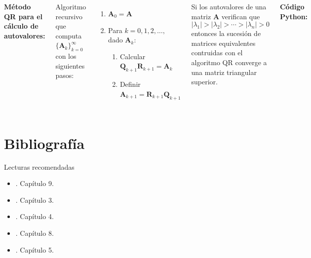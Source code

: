 \documentclass[9pt, aspectratio=169]{beamer}
\begin{document}
\begin{frame}
	\begin{columns}[t]
		\textbf{Método QR para el cálculo de autovalores:} %

		Algoritmo recursivo que computa $\{ \bm{A}_k \}_{k = 0}^{\infty}$ con los siguientes pasos:
		\begin{enumerate}
			\item $\bm{A}_0 = \bm{A}$
			\item Para $k = 0, 1, 2, \ldots,$ dado $\bm{A}_k$:
			      \begin{enumerate}
				      \item Calcular $\bm{Q}_{k+1} \bm{R}_{k+1} = \bm{A}_k $
				      \item Definir $\bm{A}_{k+1} = \bm{R}_{k+1} \bm{Q}_{k+1}$
			      \end{enumerate}
		\end{enumerate} \pause

		\begin{theorem}[Convergencia]
			Si los autovalores de una matriz $\bm{A}$ verifican que
			\[ |\lambda_1| > |\lambda_2| > \cdots > |\lambda_n| > 0 \]
			entonces la sucesión de matrices equivalentes contruidas con el algoritmo QR converge a una matriz triangular superior.
		\end{theorem}

		\textbf{Código Python:}

	\end{columns}
\end{frame}



\section*{Bibliografía}
\begin{frame}{Lecturas recomendadas}
	\begin{itemize}
		\item {}. Capítulo 9.
		\item {}. Capítulo 3.
		\item {}. Capítulo 4.
		\item {}. Capítulo 8.
		\item {}. Capítulo 5.
	\end{itemize}
\end{frame}
\end{document}
